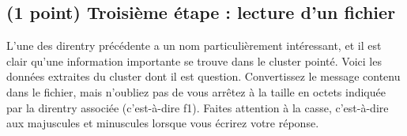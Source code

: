 \documentclass[11pt,a4paper]{article}
\begin{document}
\bigskip


\subsection{(1 point) Troisième étape : lecture d'un fichier }

L'une des direntry précédente a un nom particulièrement intéressant, et il est clair qu'une information importante se trouve dans le cluster pointé.
Voici les données extraites du cluster dont il est question.
Convertissez le message contenu dans le fichier, mais n'oubliez pas de vous arrêtez à la taille en octets indiquée par la direntry associée (c'est-à-dire f1).
Faites attention à la casse, c'est-à-dire aux majuscules et minuscules lorsque vous écrirez votre réponse.

\smallskip
\end{document}
